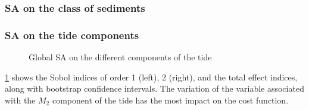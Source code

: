 \documentclass[../../Main_ManuscritThese.tex]{subfiles}
\newcommand\imgpath{/home/victor/acadwriting/Manuscrit/Text/Chapter5/img/}
\begin{document}
\subsubsection{SA on the class of sediments}

\subsubsection{SA on the tide components}
\begin{figure}[ht]
  \centering
  
  \caption{\label{fig:SA_tides} Global SA on the different components of the tide }
\end{figure}

\cref{fig:SA_tides} shows the Sobol indices of order 1 (left), 2 (right), and the total effect indices, along with bootstrap confidence intervals. The variation of the variable associated with the $M_2$ component of the tide has the most impact on the cost function.


%   

%   







\subfileLocal{
	\pagestyle{empty}
	
	
}
\end{document}

